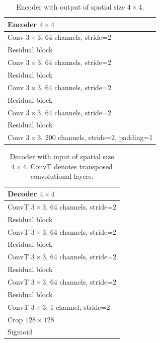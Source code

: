 \begin{table}[ht]
    \centering %
    \begin{tabular}{l}
        \toprule
        \textbf{Encoder $4 \times 4$}\\
        \midrule
        Conv $3 \times 3$, 64 channels, stride=2\\
        Residual block\\
        Conv $3 \times 3$, 64 channels, stride=2\\
        Residual block\\
        Conv $3 \times 3$, 64 channels, stride=2\\
        Residual block\\
        Conv $3 \times 3$, 64 channels, stride=2\\
        Residual block\\
        Conv $3 \times 3$, $200$ channels, stride=2, padding=1\\
        \bottomrule
    \end{tabular}
    \caption{Encoder with output of spatial size $4\times 4$.}
    \label{tab:encoder4}
\end{table}
\begin{table}[ht]
    \centering %
    \begin{tabular}{l}
        \toprule
        \textbf{Decoder $4 \times 4$}\\
        \midrule
        ConvT $3 \times 3$, 64 channels, stride=2\\
        Residual block\\
        ConvT $3 \times 3$, 64 channels, stride=2\\
        Residual block\\
        ConvT $3 \times 3$, 64 channels, stride=2\\
        Residual block\\
        ConvT $3 \times 3$, 64 channels, stride=2\\
        Residual block\\
        ConvT $3 \times 3$, 1 channel, stride=2\\
        Crop $128 \times 128$ \\
        Sigmoid\\
        \bottomrule
    \end{tabular}
    \caption{Decoder with input of spatial size $4\times 4$. ConvT denotes transposed convolutional layers.}
    \label{tab:decoder4}
\end{table}
